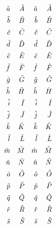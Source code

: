 \begin{align*}
  \tilde{\mathnormal{a}}&&\tilde{\mathnormal{A}}&&\hat{\mathnormal{a}}&&\hat{\mathnormal{A}}\\
  \tilde{\mathnormal{b}}&&\tilde{\mathnormal{B}}&&\hat{\mathnormal{b}}&&\hat{\mathnormal{B}}\\
  \tilde{\mathnormal{c}}&&\tilde{\mathnormal{C}}&&\hat{\mathnormal{c}}&&\hat{\mathnormal{C}}\\
  \tilde{\mathnormal{d}}&&\tilde{\mathnormal{D}}&&\hat{\mathnormal{d}}&&\hat{\mathnormal{D}}\\
  \tilde{\mathnormal{e}}&&\tilde{\mathnormal{E}}&&\hat{\mathnormal{e}}&&\hat{\mathnormal{E}}\\
  \tilde{\mathnormal{f}}&&\tilde{\mathnormal{F}}&&\hat{\mathnormal{f}}&&\hat{\mathnormal{F}}\\
  \tilde{\mathnormal{g}}&&\tilde{\mathnormal{G}}&&\hat{\mathnormal{g}}&&\hat{\mathnormal{G}}\\
  \tilde{\mathnormal{h}}&&\tilde{\mathnormal{H}}&&\hat{\mathnormal{h}}&&\hat{\mathnormal{H}}\\
  \tilde{\mathnormal{i}}&&\tilde{\mathnormal{I}}&&\hat{\mathnormal{i}}&&\hat{\mathnormal{I}}\\
  \tilde{\mathnormal{j}}&&\tilde{\mathnormal{J}}&&\hat{\mathnormal{j}}&&\hat{\mathnormal{J}}\\
  \tilde{\mathnormal{k}}&&\tilde{\mathnormal{K}}&&\hat{\mathnormal{k}}&&\hat{\mathnormal{K}}\\
  \tilde{\mathnormal{l}}&&\tilde{\mathnormal{L}}&&\hat{\mathnormal{l}}&&\hat{\mathnormal{L}}\\
  \tilde{\mathnormal{m}}&&\tilde{\mathnormal{M}}&&\hat{\mathnormal{m}}&&\hat{\mathnormal{M}}\\
  \tilde{\mathnormal{n}}&&\tilde{\mathnormal{N}}&&\hat{\mathnormal{n}}&&\hat{\mathnormal{N}}\\
  \tilde{\mathnormal{o}}&&\tilde{\mathnormal{O}}&&\hat{\mathnormal{o}}&&\hat{\mathnormal{O}}\\
  \tilde{\mathnormal{p}}&&\tilde{\mathnormal{P}}&&\hat{\mathnormal{p}}&&\hat{\mathnormal{P}}\\
  \tilde{\mathnormal{q}}&&\tilde{\mathnormal{Q}}&&\hat{\mathnormal{q}}&&\hat{\mathnormal{Q}}\\
  \tilde{\mathnormal{r}}&&\tilde{\mathnormal{R}}&&\hat{\mathnormal{r}}&&\hat{\mathnormal{R}}\\
  \tilde{\mathnormal{s}}&&\tilde{\mathnormal{S}}&&\hat{\mathnormal{s}}&&\hat{\mathnormal{S}}\\

\end{align*}

